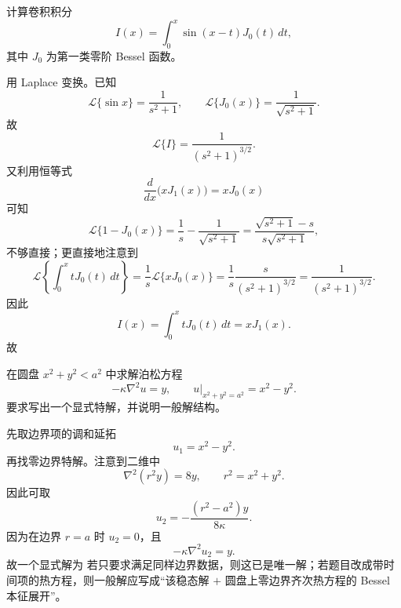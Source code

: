 ﻿


\begin{question}
计算卷积积分
\[
I(x)=\int_0^x \sin(x-t)J_0(t)\,dt,
\]
其中 $J_0$ 为第一类零阶 Bessel 函数。
\begin{solution}

用 Laplace 变换。已知
\[
\mathcal L\{\sin x\}=\frac{1}{s^2+1},\qquad \mathcal L\{J_0(x)\}=\frac{1}{\sqrt{s^2+1}}.
\]
故
\[
\mathcal L\{I\}=\frac{1}{(s^2+1)^{3/2}}.
\]
又利用恒等式
\[
\frac{d}{dx}\bigl(xJ_1(x)\bigr)=xJ_0(x)
\]
可知
\[
\mathcal L\{1-J_0(x)\}=\frac{1}{s}-\frac{1}{\sqrt{s^2+1}}
=\frac{\sqrt{s^2+1}-s}{s\sqrt{s^2+1}},
\]
不够直接；更直接地注意到
\[
\mathcal L\left\{\int_0^x tJ_0(t)\,dt\right\}=\frac1s\mathcal L\{xJ_0(x)\}=\frac1s\frac{s}{(s^2+1)^{3/2}}=\frac{1}{(s^2+1)^{3/2}}.
\]
因此
\[
I(x)=\int_0^x tJ_0(t)\,dt=xJ_1(x).
\]
故
\end{solution}
\end{question}

\begin{question}
在圆盘 $x^2+y^2<a^2$ 中求解泊松方程
\[
-\kappa\nabla^2u=y,
\qquad u|_{x^2+y^2=a^2}=x^2-y^2.
\]
要求写出一个显式特解，并说明一般解结构。
\begin{solution}

先取边界项的调和延拓
\[
 u_1=x^2-y^2.
\]
再找零边界特解。注意到二维中
\[
\nabla^2(r^2y)=8y,
\qquad r^2=x^2+y^2.
\]
因此可取
\[
 u_2=-\frac{(r^2-a^2)y}{8\kappa}.
\]
因为在边界 $r=a$ 时 $u_2=0$，且
\[
-\kappa\nabla^2u_2=y.
\]
故一个显式解为
若只要求满足同样边界数据，则这已是唯一解；若题目改成带时间项的热方程，则一般解应写成“该稳态解 $+$ 圆盘上零边界齐次热方程的 Bessel 本征展开”。
\end{solution}
\end{question}

